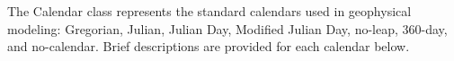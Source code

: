 
\label{sec:Calendar}
The Calendar class represents the standard calendars used in 
geophysical modeling:  Gregorian, Julian, Julian Day, Modified Julian Day, 
no-leap, 360-day, and no-calendar.  Brief descriptions are provided for each calendar below.
